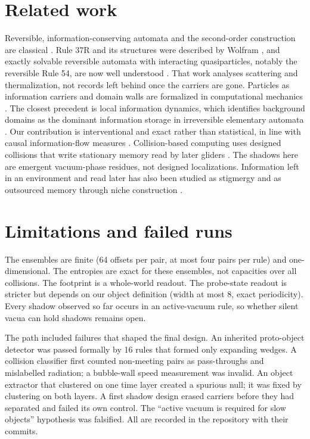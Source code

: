 \documentclass{article}
\begin{document}
\section{Related work}
Reversible, information-conserving automata and the second-order construction are classical
\cite{fredkin1982,toffoli1987,toffoli1990}. Rule 37R and its structures were described by Wolfram
\cite{wolfram2002}, and exactly solvable reversible automata with interacting quasiparticles,
notably the reversible Rule 54, are now well understood
\cite{buca2021,klobas2022,prosen2023,wilkinson2022}. That work analyses scattering and
thermalization, not records left behind once the carriers are gone. Particles as information carriers
and domain walls are formalized in computational mechanics
\cite{hanson1992,hanson1997,hordijk2001,pivato2007,rupe2018}. The closest precedent is local
information dynamics, which identifies background domains as the dominant information storage in
irreversible elementary automata \cite{lizier2012}. Our contribution is interventional and exact
rather than statistical, in line with causal information-flow measures \cite{ay2008,lizier2010caus}.
Collision-based computing uses designed collisions that write stationary memory read by later
gliders \cite{adamatzky2012,martinez2006,martinez2011,martinez2012}. The shadows here are
emergent vacuum-phase residues, not designed localizations. Information left in an environment and
read later has also been studied as stigmergy \cite{klyubin2004} and as outsourced memory through
niche construction \cite{lee2022}.

\section{Limitations and failed runs}\label{sec:limits}
The ensembles are finite (64 offsets per pair, at most four pairs per rule) and one-dimensional.
The entropies are exact for these ensembles, not capacities over all collisions. The footprint is a
whole-world readout. The probe-state readout is stricter but depends on our object definition (width
at most 8, exact periodicity). Every shadow observed so far occurs in an active-vacuum rule, so whether
silent vacua can hold shadows remains open.

The path included failures that shaped the final design. An inherited proto-object detector
was passed formally by 16 rules that formed only expanding wedges. A collision classifier first
counted non-meeting pairs as pass-throughs and mislabelled radiation; a bubble-wall speed
measurement was invalid. An object extractor that clustered on one time layer created a spurious
null; it was fixed by clustering on both layers. A first shadow design erased carriers before they had
separated and failed its own control. The ``active vacuum is required for slow objects'' hypothesis
was falsified. All are recorded in the repository with their commits.
\end{document}
